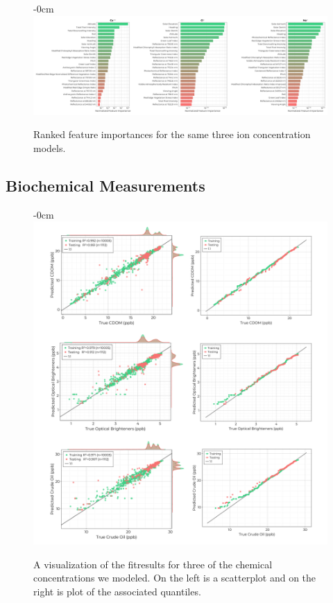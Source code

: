 \documentclass[journal,article,submit,pdftex,moreauthors]{Definitions/mdpi}
\begin{document}
\begin{figure}[H]
\begin{adjustwidth}{-\extralength}{0cm}
\centering
\includegraphics[width=18.0cm]{paper/figures/results/fits/ions-ranking.pdf}
\end{adjustwidth}
\caption{Ranked feature importances for the same three ion concentration models.\label{fig:ions-fit}}
\end{figure}  


\subsection{Biochemical Measurements}


\begin{figure}[H]
\begin{adjustwidth}{-\extralength}{0cm}
\centering
\includegraphics[width=16.0cm]{paper/figures/results/fits/chemical-fitres.pdf}
\end{adjustwidth}
\caption{A visualization of the fitresults for three of the chemical concentrations we modeled. On the left is a scatterplot and on the right is plot of the associated quantiles.\label{fig:chemicals-fit}}
\end{figure}  
\end{document}
